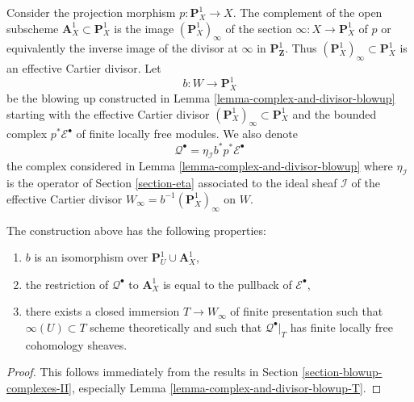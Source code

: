 \medskip\noindent
Consider the projection morphism $p : \mathbf{P}^1_X \to X$.
The complement of the open subscheme $\mathbf{A}^1_X \subset \mathbf{P}^1_X$
is the image $(\mathbf{P}^1_X)_\infty$ of the section
$\infty : X \to \mathbf{P}^1_X$ of $p$ or equivalently the
inverse image of the divisor at $\infty$ in $\mathbf{P}^1_\mathbf{Z}$.
Thus $(\mathbf{P}^1_X)_\infty \subset \mathbf{P}^1_X$ is an effective
Cartier divisor. Let
$$
b : W \longrightarrow \mathbf{P}^1_X
$$
be the blowing up constructed in Lemma \ref{lemma-complex-and-divisor-blowup}
starting with the effective Cartier divisor
$(\mathbf{P}^1_X)_\infty \subset \mathbf{P}^1_X$ and the bounded complex
$p^*\mathcal{E}^\bullet$ of finite locally free modules. We also denote
$$
\mathcal{Q}^\bullet = \eta_\mathcal{I} b^*p^*\mathcal{E}^\bullet
$$
the complex considered in Lemma \ref{lemma-complex-and-divisor-blowup}
where $\eta_\mathcal{I}$ is the operator of Section \ref{section-eta}
associated to the ideal sheaf $\mathcal{I}$
of the effective Cartier divisor $W_\infty = b^{-1}(\mathbf{P}^1_X)_\infty$
on $W$.

\begin{lemma}
\label{lemma-graph-construction}
The construction above has the following properties:
\begin{enumerate}
\item $b$ is an isomorphism over $\mathbf{P}^1_U \cup \mathbf{A}^1_X$,
\item the restriction of $\mathcal{Q}^\bullet$ to $\mathbf{A}^1_X$
is equal to the pullback of $\mathcal{E}^\bullet$,
\item there exists a closed immersion $T \to W_\infty$ of finite presentation
such that $\infty(U) \subset T$ scheme theoretically and
such that $\mathcal{Q}^\bullet|_T$ has finite locally free cohomology
sheaves.
\end{enumerate}
\end{lemma}

\begin{proof}
This follows immediately from the results in
Section \ref{section-blowup-complexes-II},
especially Lemma \ref{lemma-complex-and-divisor-blowup-T}.
\end{proof}

















